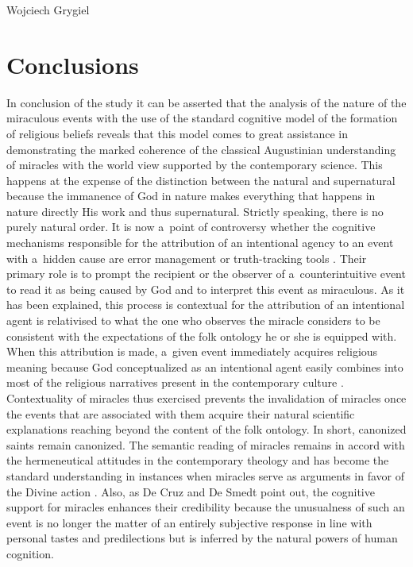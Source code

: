 \begin{artengenv}{Wojciech Grygiel}
\section*{Conclusions}
In conclusion of the study it can be asserted that the analysis of the nature of the miraculous events with the use of the standard cognitive model of the formation of religious beliefs reveals that this model comes to great assistance in demonstrating the marked coherence of the classical Augustinian understanding of miracles with the world view supported by the contemporary science. This happens at the expense of the distinction between the natural and supernatural because the immanence of God in nature makes everything that happens in nature directly His work and thus supernatural. Strictly speaking, there is no purely natural order. It is now a~point of controversy whether the cognitive mechanisms responsible for the attribution of an intentional agency to an event with a~hidden cause are error management or truth-tracking tools
\parencites[][]{barrett_should_2013}[][]{van_eyghen_is_2019}. %
 Their primary role is to prompt the recipient or the observer of a~counterintuitive event to read it as being caused by God and to interpret this event as miraculous. As it has been explained, this process is contextual for the attribution of an intentional agent is relativised to what the one who observes the miracle considers to be consistent with the expectations of the folk ontology he or she is equipped with. When this attribution is made, a~given event immediately acquires religious meaning because God conceptualized as an intentional agent easily combines into most of the religious narratives present in the contemporary culture 
\parencite[e.g.][pp.172–178]{de_cruz_natural_2015}. %
 Contextuality of miracles thus exercised prevents the invalidation of miracles once the events that are associated with them acquire their natural scientific explanations reaching beyond the content of the folk ontology. In short, canonized saints remain canonized. The semantic reading of miracles remains in accord with the hermeneutical attitudes in the contemporary theology and has become the standard understanding in instances when miracles serve as arguments in favor of the Divine action 
\parencite[e.g.][pp.211–290]{rusecki_traktat_2006}. %
 Also, as De Cruz and De Smedt 
\parencite*[][p.160]{de_cruz_natural_2015} %
 point out, the cognitive support for miracles enhances their credibility because the unusualness of such an event is no longer the matter of an entirely subjective response in line with personal tastes and predilections but is inferred by the natural powers of human cognition.


\end{artengenv}
